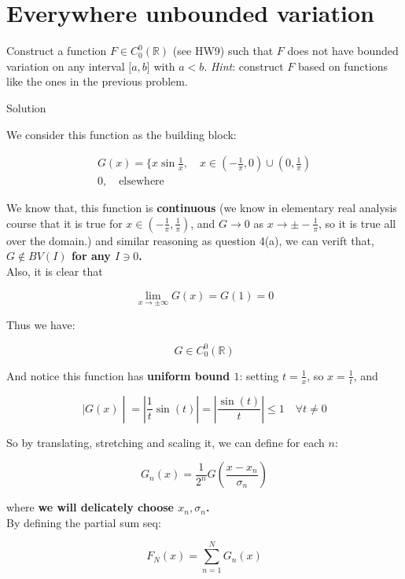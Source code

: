 \section{Everywhere unbounded variation}\label{everywhere-unbounded-variation}

Construct a function \(F \in C_{0}^{0}(\mathbb{R})\) (see HW9) such that \(F\) does not have bounded variation on any interval \(\lbrack a,b\rbrack\) with \(a < b\). \emph{Hint}: construct \(F\) based on functions like the ones in the previous problem.

\begin{qlsolution}{Solution}

We consider this function as the building block:

\[\begin{matrix}
{G(x) = \{ x\sin\frac{1}{x},\quad x \in ( - \frac{1}{\pi},0) \cup (0,\frac{1}{\pi})} \\
{0,\quad\text{elsewhere}}
\end{matrix}\]

We know that, this function is \textbf{continuous} (we know in elementary real analysis course that it is true for \(x \in ( - \frac{1}{\pi},\frac{1}{\pi})\), and \(G\rightarrow 0\) as \(x\rightarrow \pm - \frac{1}{\pi}\), so it is true all over the domain.) and similar reasoning as question 4(a), we can verift that, \textbf{\(G \notin BV(I)\) for any \(I \ni 0\).}\\
Also, it is clear that

\[\lim\limits_{x\rightarrow \pm \infty}G(x) = G(1) = 0\]

Thus we have:

\[G \in C_{0}^{0}(\mathbb{R})\]

And notice this function has \textbf{uniform bound \(1\)}: setting \(t = \frac{1}{x}\), so \(x = \frac{1}{t}\), and

\[\left. |G(x) \middle| = \left| {\frac{1}{t}\sin(t)} \right| = \left| \frac{\sin(t)}{t} \right| \leq 1\quad\forall t \neq 0 \right.\]

So by translating, stretching and scaling it, we can define for each \(n\):

\[G_{n}(x) = \frac{1}{2^{n}}G(\frac{x - x_{n}}{\sigma_{n}})\]

where \textbf{we will delicately choose \(x_{n},\sigma_{n}\).}\\
By defining the partial sum seq:

\[F_{N}(x) = \sum\limits_{n = 1}^{N}G_{n}(x)\]


\end{qlsolution}

